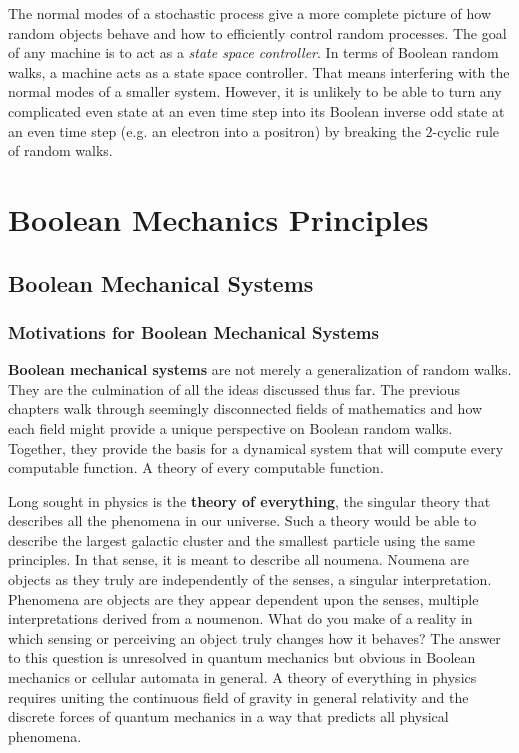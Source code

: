 \documentclass[10pt, a5paper, twoside, openright]{memoir}
\begin{document}
The normal modes of a stochastic process give a more complete picture of how random objects behave and how to efficiently control random processes. The goal of any machine is to act as a \textit{state space controller}. In terms of Boolean random walks, a machine acts as a state space controller. That means interfering with the normal modes of a smaller system. However, it is unlikely to be able to turn any complicated even state at an even time step into its Boolean inverse odd state at an even time step (e.g. an electron into a positron) by breaking the $2$-cyclic rule of random walks.


\part{Boolean Mechanics Principles}

\chapter{Boolean Mechanical Systems}
\section{Motivations for Boolean Mechanical Systems}
\textbf{Boolean mechanical systems} are not merely a generalization of random walks. They are the culmination of all the ideas discussed thus far. The previous chapters walk through seemingly disconnected fields of mathematics and how each field might provide a unique perspective on Boolean random walks. Together, they provide the basis for a dynamical system that will compute every computable function. A theory of every computable function.

Long sought in physics is the \textbf{theory of everything}, the singular theory that describes all the phenomena in our universe. Such a theory would be able to describe the largest galactic cluster and the smallest particle using the same principles. In that sense, it is meant to describe all noumena. Noumena are objects as they truly are independently of the senses, a singular interpretation. Phenomena are objects are they appear dependent upon the senses, multiple interpretations derived from a noumenon. What do you make of a reality in which sensing or perceiving an object truly changes how it behaves? The answer to this question is unresolved in quantum mechanics but obvious in Boolean mechanics or cellular automata in general. A theory of everything in physics requires uniting the continuous field of gravity in general relativity and the discrete forces of quantum mechanics in a way that predicts all physical phenomena.
\end{document}
